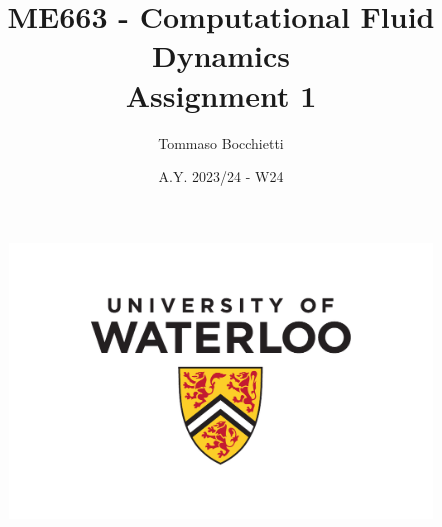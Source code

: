 \documentclass{assignment}
\begin{document}
\graphicspath{{./img/}}


\title{ME663 - Computational Fluid Dynamics \\ Assignment 1}
\author{Tommaso Bocchietti}
\date{A.Y. 2023/24 - W24}

\maketitle

\begin{figure}[H]
    \centering
    \includegraphics[width=.9\textwidth]{./pdf/UniversityOfWaterloo_logo_vert_pms}
    \label{fig:University_Of_Waterloo_logo}
\end{figure}

\clearpage
\tableofcontents
\listoffigures
\listoftables
\printglossary[type=\acronymtype]

\clearpage



% 

\clearpage





% 
\end{document}
